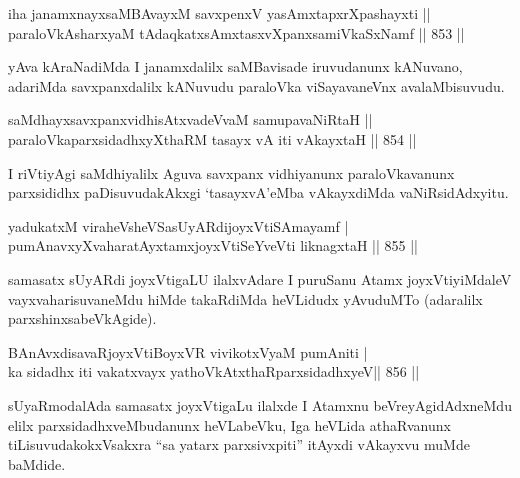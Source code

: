 
\begin{shl}
iha janamxnayxsaMBAvayxM savxpenxV yasAmxtapxrXpashayxti ||  \\
paraloVkAsharxyaM tAdaqkatxsAmxtasxvXpanxsamiVkaSxNamf \hfill||  853 ||  
\end{shl}

\begin{artha}
yAva kAraNadiMda I janamxdalilx saMBavisade iruvudanunx kANuvano, adariMda savxpanxdalilx kANuvudu paraloVka viSayavaneVnx avalaMbisuvudu.
\end{artha}


\begin{shl}
saMdhayxsavxpanxvidhisAtxvadeVvaM samupavaNiRtaH ||  \\
paraloVkaparxsidadhxyXthaRM tasayx vA iti vAkayxtaH \hfill||  854 ||  
\end{shl}

\begin{artha}
I riVtiyAgi saMdhiyalilx Aguva savxpanx vidhiyanunx paraloVkavanunx parxsididhx paDisuvudakAkxgi `tasayxvA'eMba vAkayxdiMda vaNiRsidAdxyitu.
\end{artha}

\begin{shl}
yadukatxM viraheV\s sheVSasUyARdijoyxVtiSAmayamf | \\
pumAnavxyXvaharatAyxtamxjoyxVtiSeYveVti liknagxtaH \hfill||  855 ||  
\end{shl}

\begin{artha}
samasatx sUyARdi joyxVtigaLU ilalxvAdare I puruSanu Atamx joyxVtiyiMdaleV vayxvaharisuvaneMdu hiMde takaRdiMda heVLidudx yAvuduMTo (adaralilx parxshinxsabeVkAgide).
\end{artha}

\begin{shl}
BAnAvxdisavaRjoyxVtiBoyxVR vivikotxV\s yaM pumAniti | \\
ka sidadhx iti vakatxvayx yathoVkAtxthaRparxsidadhxyeV\hfill ||  856 ||  
\end{shl}

\begin{artha}
sUyaRmodalAda samasatx joyxVtigaLu ilalxde I Atamxnu beVreyAgidAdxneMdu elilx parxsidadhxveMbudanunx heVLabeVku, Iga heVLida athaRvanunx tiLisuvudakokxVsakxra ``sa yatarx parxsivxpiti'' itAyxdi vAkayxvu muMde baMdide.
\end{artha}

